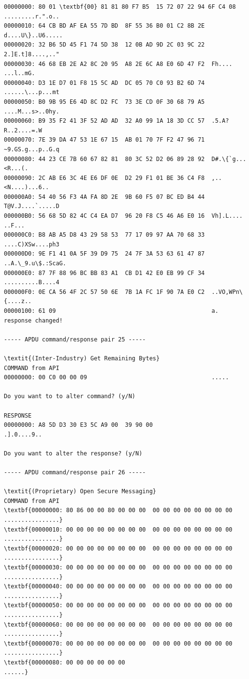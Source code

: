 \documentclass[bsc,frontabs,twoside,singlespacing,parskip,deptreport]{infthesis}     %
\begin{document}
\begin{appendices}
\begin{Verbatim}[commandchars=\\\{\}, fontsize=\small]
00000000: 80 01 \textbf{00} 81 81 80 F7 B5  15 72 07 22 94 6F C4 08  .........r.".o..
00000010: 64 CB BD AF EA 55 7D BD  8F 55 36 B0 01 C2 8B 2E  d....U\}..U6.....
00000020: 32 B6 5D 45 F1 74 5D 38  12 0B AD 9D 2C 03 9C 22  2.]E.t]8....,.."
00000030: 46 68 EB 2E A2 8C 20 95  A8 2E 6C A8 E0 6D 47 F2  Fh.... ...l..mG.
00000040: D3 1E D7 01 F8 15 5C AD  DC 05 70 C0 93 B2 6D 74  ......\...p...mt
00000050: B0 9B 95 E6 4D 8C D2 FC  73 3E CD 0F 30 68 79 A5  ....M...s>..0hy.
00000060: B9 35 F2 41 3F 52 AD AD  32 A0 99 1A 18 3D CC 57  .5.A?R..2....=.W
00000070: 7E 39 DA 47 53 1E 67 15  AB 01 70 7F F2 47 96 71  ~9.GS.g...p..G.q
00000080: 44 23 CE 7B 60 67 82 81  80 3C 52 D2 06 89 28 92  D#.\{`g...<R...(.
00000090: 2C AB E6 3C 4E E6 DF 0E  D2 29 F1 01 BE 36 C4 F8  ,..<N....)...6..
000000A0: 54 40 56 F3 4A FA 8D 2E  9B 60 F5 07 BC ED B4 44  T@V.J....`.....D
000000B0: 56 68 5D 82 4C C4 EA D7  96 20 F8 C5 46 A6 E0 16  Vh].L.... ..F...
000000C0: B8 AB A5 D8 43 29 58 53  77 17 09 97 AA 70 68 33  ....C)XSw....ph3
000000D0: 9E F1 41 0A 5F 39 D9 75  24 7F 3A 53 63 61 47 87  ..A.\_9.u\$.:ScaG.
000000E0: 87 7F 88 96 BC BB 83 A1  CB D1 42 E0 EB 99 CF 34  ..........B....4
000000F0: 0E CA 56 4F 2C 57 50 6E  7B 1A FC 1F 90 7A E0 C2  ..VO,WPn\{....z..
00000100: 61 09                                             a.
response changed!

----- APDU command/response pair 25 -----

\textit{(Inter-Industry) Get Remaining Bytes}
COMMAND from API
00000000: 00 C0 00 00 09                                    .....

Do you want to to alter command? (y/N)

RESPONSE
00000000: A8 5D D3 30 E3 5C A9 00  39 90 00                 .].0....9..

Do you want to alter the response? (y/N)

----- APDU command/response pair 26 -----

\textit{(Proprietary) Open Secure Messaging}
COMMAND from API
\textbf{00000000: 80 86 00 00 80 00 00 00  00 00 00 00 00 00 00 00  ................}
\textbf{00000010: 00 00 00 00 00 00 00 00  00 00 00 00 00 00 00 00  ................}
\textbf{00000020: 00 00 00 00 00 00 00 00  00 00 00 00 00 00 00 00  ................}
\textbf{00000030: 00 00 00 00 00 00 00 00  00 00 00 00 00 00 00 00  ................}
\textbf{00000040: 00 00 00 00 00 00 00 00  00 00 00 00 00 00 00 00  ................}
\textbf{00000050: 00 00 00 00 00 00 00 00  00 00 00 00 00 00 00 00  ................}
\textbf{00000060: 00 00 00 00 00 00 00 00  00 00 00 00 00 00 00 00  ................}
\textbf{00000070: 00 00 00 00 00 00 00 00  00 00 00 00 00 00 00 00  ................}
\textbf{00000080: 00 00 00 00 00 00                                 ......}


\end{Verbatim}
\end{appendices}
\end{document}
